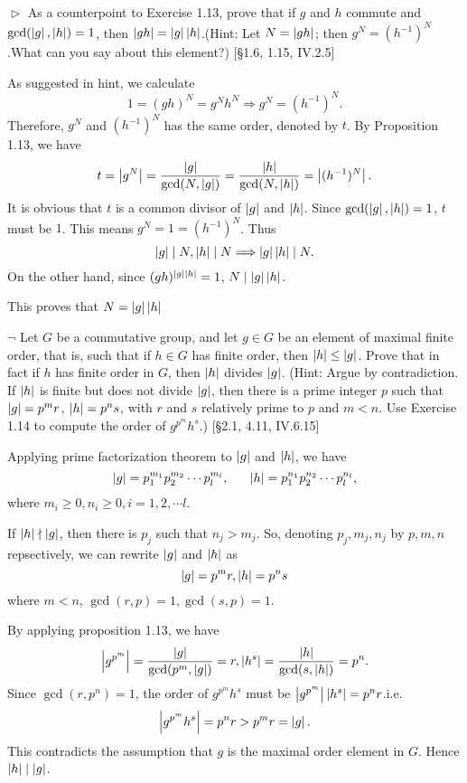 \begin{problem}[1.14]
$\vartriangleright$ As a counterpoint to Exercise 1.13, prove that if $g$ and $h$ commute and
$\gcd(\left|g\right|, \left|h\right|)=1$, then $\left|gh\right|=\left|g\right|\left|h\right|$.(Hint: Let $N=\left|gh\right|$; then $g^N=(h^{-1})^{N}$.What
can you say about this element?) [\S 1.6, 1.15, IV.2.5]
\end{problem}

\begin{solution}
As suggested in hint, we calculate 
$$1 = (gh)^N = g^Nh^N\Longrightarrow g^N = (h^{-1})^N.$$
Therefore, $g^N$ and $(h^{-1})^{N}$ has the same order, denoted by $t$. By Proposition 1.13, we have
$$t = \left|g^N\right| = \frac{\left|g\right|}{\gcd(N, \left|g\right|)} = \frac{\left|h\right|}{\gcd(N, \left|h\right|)} = \left|(h^{-1})^N\right|.$$
It is obvious that $t$ is a common divisor of $\left|g\right|$ and $\left|h\right|$. Since $\gcd(\left|g\right|, \left|h\right|)=1$, $t$ must be $1$.
This means $g^N = 1 = (h^{-1})^N$. Thus
$$\left|g\right| \mid N, \left|h\right| \mid N\Longrightarrow \left|g\right|\left|h\right|\mid N.$$
On the other hand, since $(gh)^{\left|g\right|\left|h\right|} =1$, $N\mid\left|g\right|\left|h\right|$.

This proves that $N = \left|g\right|\left|h\right|$
\end{solution}

\begin{problem}[1.15]
$\neg$ Let $G$ be a commutative group, and let $g \in G$ be an element of maximal
finite order, that is, such that if $h \in G$ has finite order, then $\left|h\right| \leq \left|g\right|$. 
Prove that in fact if $h$ has finite order in $G$, then $\left|h\right|$ divides $\left|g\right|$. (Hint: 
Argue by contradiction. If $\left|h\right|$ is finite but does not divide $\left|g\right|$, 
then there is a prime integer $p$ such that $\left|g\right|=p^mr$, $\left|h\right|=p^ns$, with $r$ and $s$ relatively 
prime to $p$ and $m < n$. Use Exercise 1.14 to compute the order of $g^{p^m}h^s$.) [\S 2.1, 4.11, IV.6.15]
\end{problem}

\begin{solution}
Applying prime factorization theorem to $\left|g\right|$ and $\left|h\right|$, we have
$$\abs{g} = p_1^{m_1}p_2^{m_2}\cdots p_l^{m_l}, \indent \abs{h} = p_1^{n_1}p_2^{n_2}\cdots p_l^{n_l},$$
where $m_i \geq 0, n_i \geq 0, i = 1, 2,\cdots l$.

If $\left|h\right|\nmid\left|g\right|$, then there is $p_j$ such that $n_j > m_j$. So, denoting $p_j, m_j, n_j$ by $p,m,n$ repsectively, 
we can rewrite 
$\left|g\right|$ and $\left|h\right|$ as
$$\left|g\right| = p^{m}r, \left|h\right| = p^ns$$
where $m < n$, $\gcd(r,p)=1, \gcd(s,p) = 1$.

By applying proposition 1.13, we have
$$\left|g^{p^m}\right| = \frac{\left|g\right|}{\gcd(p^m, \left|g\right|)} = r, \left|h^s\right| = \frac{\left|h\right|}{\gcd(s,\left|h\right|)} = p^n.$$
Since $\gcd(r, p^n) = 1$, the order of $g^{p^m}h^s$ must be $\left|g^{p^m}\right|\left|h^s\right| = p^nr$.i.e.
$$\left|g^{p^m}h^s\right| = p^nr > p^mr=\left|g\right|.$$
This contradicts the assumption that $g$ is the maximal order element in $G$. Hence $\left|h\right|\mid\left|g\right|$.
\end{solution}


